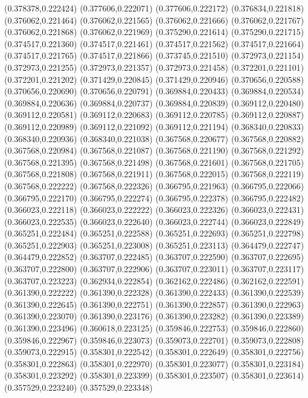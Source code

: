 (0.378378,0.222424)
(0.377606,0.222071)
(0.377606,0.222172)
(0.376834,0.221818)
(0.376062,0.221464)
(0.376062,0.221565)
(0.376062,0.221666)
(0.376062,0.221767)
(0.376062,0.221868)
(0.376062,0.221969)
(0.375290,0.221614)
(0.375290,0.221715)
(0.374517,0.221360)
(0.374517,0.221461)
(0.374517,0.221562)
(0.374517,0.221664)
(0.374517,0.221765)
(0.374517,0.221866)
(0.373745,0.221510)
(0.372973,0.221154)
(0.372973,0.221255)
(0.372973,0.221357)
(0.372973,0.221458)
(0.372201,0.221101)
(0.372201,0.221202)
(0.371429,0.220845)
(0.371429,0.220946)
(0.370656,0.220588)
(0.370656,0.220690)
(0.370656,0.220791)
(0.369884,0.220433)
(0.369884,0.220534)
(0.369884,0.220636)
(0.369884,0.220737)
(0.369884,0.220839)
(0.369112,0.220480)
(0.369112,0.220581)
(0.369112,0.220683)
(0.369112,0.220785)
(0.369112,0.220887)
(0.369112,0.220989)
(0.369112,0.221092)
(0.369112,0.221194)
(0.368340,0.220833)
(0.368340,0.220936)
(0.368340,0.221038)
(0.367568,0.220677)
(0.367568,0.220882)
(0.367568,0.220984)
(0.367568,0.221087)
(0.367568,0.221190)
(0.367568,0.221292)
(0.367568,0.221395)
(0.367568,0.221498)
(0.367568,0.221601)
(0.367568,0.221705)
(0.367568,0.221808)
(0.367568,0.221911)
(0.367568,0.222015)
(0.367568,0.222119)
(0.367568,0.222222)
(0.367568,0.222326)
(0.366795,0.221963)
(0.366795,0.222066)
(0.366795,0.222170)
(0.366795,0.222274)
(0.366795,0.222378)
(0.366795,0.222482)
(0.366023,0.222118)
(0.366023,0.222222)
(0.366023,0.222326)
(0.366023,0.222431)
(0.366023,0.222535)
(0.366023,0.222640)
(0.366023,0.222744)
(0.366023,0.222849)
(0.365251,0.222484)
(0.365251,0.222588)
(0.365251,0.222693)
(0.365251,0.222798)
(0.365251,0.222903)
(0.365251,0.223008)
(0.365251,0.223113)
(0.364479,0.222747)
(0.364479,0.222852)
(0.363707,0.222485)
(0.363707,0.222590)
(0.363707,0.222695)
(0.363707,0.222800)
(0.363707,0.222906)
(0.363707,0.223011)
(0.363707,0.223117)
(0.363707,0.223223)
(0.362934,0.222854)
(0.362162,0.222486)
(0.362162,0.222591)
(0.361390,0.222222)
(0.361390,0.222328)
(0.361390,0.222433)
(0.361390,0.222539)
(0.361390,0.222645)
(0.361390,0.222751)
(0.361390,0.222857)
(0.361390,0.222963)
(0.361390,0.223070)
(0.361390,0.223176)
(0.361390,0.223282)
(0.361390,0.223389)
(0.361390,0.223496)
(0.360618,0.223125)
(0.359846,0.222753)
(0.359846,0.222860)
(0.359846,0.222967)
(0.359846,0.223073)
(0.359073,0.222701)
(0.359073,0.222808)
(0.359073,0.222915)
(0.358301,0.222542)
(0.358301,0.222649)
(0.358301,0.222756)
(0.358301,0.222863)
(0.358301,0.222970)
(0.358301,0.223077)
(0.358301,0.223184)
(0.358301,0.223292)
(0.358301,0.223399)
(0.358301,0.223507)
(0.358301,0.223614)
(0.357529,0.223240)
(0.357529,0.223348)
